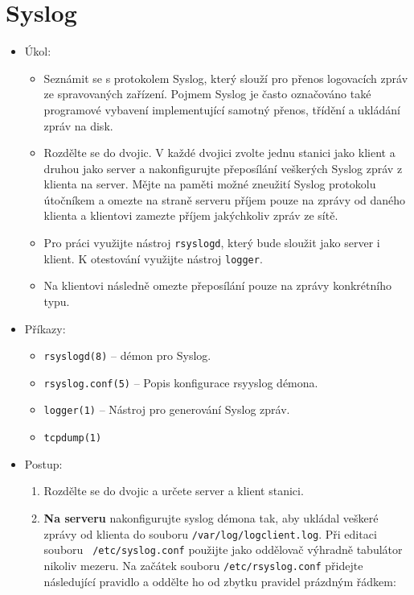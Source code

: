 \section{Syslog}
  \begin{itemize}
    \item Úkol: 
    \begin{itemize}
      \item Seznámit se s protokolem Syslog, který slouží pro přenos
      logovacích zpráv ze spravovaných zařízení. Pojmem Syslog je často označováno také
      programové vybavení implementující samotný přenos, třídění a ukládání zpráv na disk.
      \item Rozdělte se do dvojic. V každé dvojici zvolte jednu stanici jako klient a
      druhou jako server a nakonfigurujte přeposílání veškerých Syslog zpráv 
      z klienta na server. Mějte na paměti možné zneužití Syslog protokolu útočníkem a omezte
      na straně serveru příjem pouze na zprávy od daného klienta
      a klientovi zamezte příjem jakýchkoliv zpráv ze sítě.
      \item Pro práci využijte nástroj {\tt rsyslogd}, který bude sloužit jako server i klient. K
      otestování využijte nástroj {\tt logger}.
      \item Na klientovi následně omezte přeposílání pouze na zprávy konkrétního typu.
    \end{itemize}
    \item Příkazy:
       \begin{itemize}
            \item {\tt rsyslogd(8)} -- démon pro Syslog.
            \item {\tt rsyslog.conf(5)} -- Popis konfigurace rsyyslog démona.
            \item {\tt logger(1)} -- Nástroj pro generování Syslog zpráv.
            \item {\tt tcpdump(1)}
        \end{itemize}
    \item Postup:
       \begin{enumerate}
            \item Rozdělte se do dvojic a určete server a klient stanici.

            \item {\bf Na serveru} nakonfigurujte syslog démona tak, aby ukládal veškeré zprávy
         od klienta do souboru {\tt /var/log/logclient.log}. Při editaci souboru {\tt
         /etc/syslog.conf} použijte jako oddělovač výhradně
         tabulátor nikoliv mezeru. Na začátek souboru {\tt /etc/rsyslog.conf} přidejte následující pravidlo a oddělte ho od zbytku pravidel
         prázdným řádkem:


\end{enumerate}
\end{itemize}
